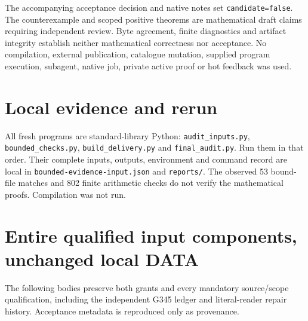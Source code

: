 \documentclass[11pt]{article}
\begin{document}
The accompanying acceptance decision and native notes set
\texttt{candidate=false}. The counterexample and scoped
positive theorems are mathematical draft claims requiring
independent review. Byte agreement, finite diagnostics and
artifact integrity establish neither mathematical correctness
nor acceptance. No compilation, external publication,
catalogue mutation, supplied program execution, subagent,
native job, private active proof or hot feedback was used.

\section*{Local evidence and rerun}
All fresh programs are standard-library Python: \texttt{audit\_inputs.py},
\texttt{bounded\_checks.py}, \texttt{build\_delivery.py} and
\texttt{final\_audit.py}. Run them in that order.
Their complete inputs, outputs, environment and command record are local
in \texttt{bounded-evidence-input.json} and \texttt{reports/}.
The observed 53 bound-file matches and 802 finite arithmetic checks
do not verify the mathematical proofs. Compilation was not run.
\appendix
\section{Entire qualified input components, unchanged local DATA}
The following bodies preserve both grants and every mandatory source/scope
qualification, including the independent G345 ledger and literal-reader
repair history. Acceptance metadata is reproduced only as provenance.
\end{document}
